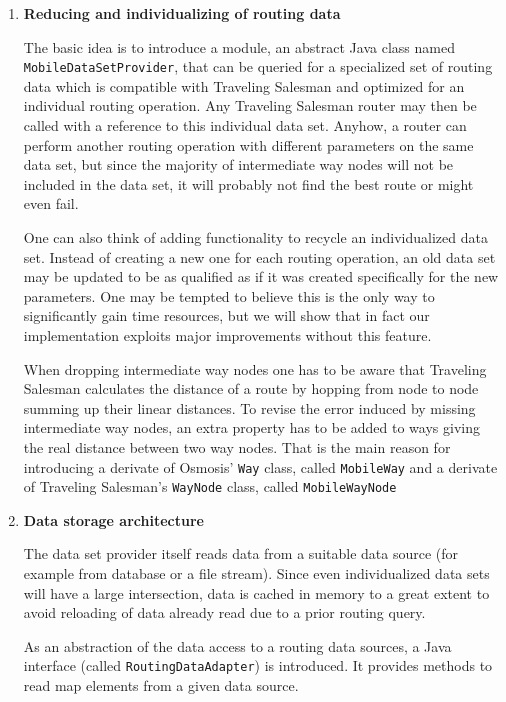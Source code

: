 \begin{enumerate}
	\item \textbf{Reducing and individualizing of routing data}

The basic idea is to introduce a module, an abstract Java class named \texttt{MobileDataSetProvider}, that can be queried for a specialized set of routing data which is compatible with Traveling Salesman and optimized for an individual routing operation. Any Traveling Salesman router may then be called with a reference to this individual data set. Anyhow, a router can perform another routing operation with different parameters on the same data set, but since the majority of intermediate way nodes will not be included in the data set, it will probably not find the best route or might even fail.\newline

One can also think of adding functionality to recycle an individualized data set. Instead of creating a new one for each routing operation, an old data set may be updated to be as qualified as if it was created specifically for the new parameters. One may be tempted to believe this is the only way to significantly gain time resources, but we will show that in fact our implementation exploits major improvements without this feature.\newline

When dropping intermediate way nodes one has to be aware that Traveling Salesman calculates the distance of a route by hopping from node to node summing up their linear distances. To revise the error induced by missing intermediate way nodes, an extra property has to be added to ways giving the real distance between two way nodes. That is the main reason for introducing a derivate of Osmosis' \texttt{Way} class, called \texttt{MobileWay} and  a derivate of Traveling Salesman's \texttt{WayNode} class, called \texttt{MobileWayNode}

	\item \textbf{Data storage architecture}

The data set provider itself reads data from a suitable data source (for example from database or a file stream). Since even individualized data sets will have a large intersection, data is cached in memory to a great extent to avoid reloading of data already read due to a prior routing query.\newline

As an abstraction of the data access to a routing data sources, a Java interface (called \texttt{RoutingDataAdapter}) is introduced. It provides methods to read map elements from a given data source.\newline


\end{enumerate}
